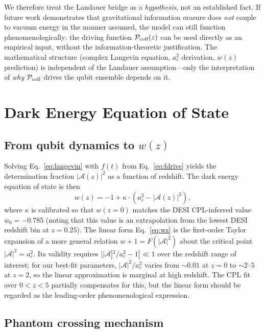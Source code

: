 \documentclass[aps,prd,twocolumn,superscriptaddress]{revtex4-2}
\begin{document}
We therefore treat the Landauer bridge as a \emph{hypothesis}, not an established fact. If future work demonstrates that gravitational information erasure does \emph{not} couple to vacuum energy in the manner assumed, the model can still function phenomenologically: the driving function $\mathcal{P}_{\rm coll}(z)$ can be used directly as an empirical input, without the information-theoretic justification. The mathematical structure (complex Langevin equation, $a_c^2$ derivation, $w(z)$ prediction) is independent of the Landauer assumption---only the interpretation of \emph{why} $\mathcal{P}_{\rm coll}$ drives the qubit ensemble depends on it.

\section{Dark Energy Equation of State}
\label{sec:darkenergy}

\subsection{From qubit dynamics to $w(z)$}

Solving Eq.~\eqref{eq:langevin} with $f(t)$ from Eq.~\eqref{eq:fdrive} yields the determination fraction $|\mathcal{A}(z)|^2$ as a function of redshift. The dark energy equation of state is then
\begin{equation}
w(z) = -1 + \kappa \cdot \left(a_c^2 - |\mathcal{A}(z)|^2\right),
\label{eq:wz}
\end{equation}
where $\kappa$ is calibrated so that $w(z=0)$ matches the DESI CPL-inferred value $w_0 = -0.785$ (noting that this value is an extrapolation from the lowest DESI redshift bin at $z=0.25$). The linear form Eq.~\eqref{eq:wz} is the first-order Taylor expansion of a more general relation $w+1 = F(|\mathcal{A}|^2)$ about the critical point $|\mathcal{A}|^2 = a_c^2$. Its validity requires $||\mathcal{A}|^2/a_c^2 - 1| \ll 1$ over the redshift range of interest; for our best-fit parameters, $|\mathcal{A}|^2/a_c^2$ varies from $\sim 0.01$ at $z=0$ to $\sim 2$--$5$ at $z=2$, so the linear approximation is marginal at high redshift. The CPL fit over $0 < z < 5$ partially compensates for this, but the linear form should be regarded as the leading-order phenomenological expression.

\subsection{Phantom crossing mechanism}
\end{document}
